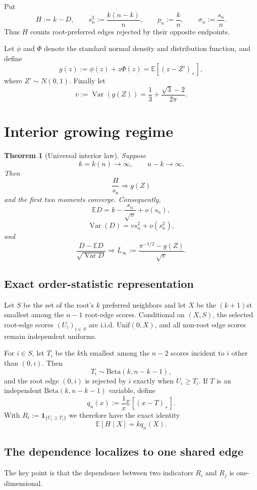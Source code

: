 \documentclass[11pt]{article}
\newtheorem{theorem}{Theorem}[section]
\theoremstyle{remark}
\newcommand{\E}{\mathbb E}
\newcommand{\Var}{\operatorname{Var}}
\newcommand{\1}{\mathbf 1}
\begin{document}
Put
\[
H:=k-D,
\qquad
s_n^2:=\frac{k(n-k)}n,
\qquad
p_n:=\frac kn,
\qquad
\sigma_n:=\frac{s_n}{n}.
\]
Thus $H$ counts root-preferred edges rejected by their opposite endpoints.

Let $\phi$ and $\Phi$ denote the standard normal density and distribution function, and define
\[
g(z):=\phi(z)+z\Phi(z)=\E[(z-Z')_+],
\]
where $Z'\sim N(0,1)$. Finally let
\[
v:=\Var(g(Z))=\frac13+\frac{\sqrt3-2}{2\pi}.
\]

\section{Interior growing regime}

\begin{theorem}[Universal interior law]\label{thm:interior}
Suppose
\[
k=k(n)\to\infty,
\qquad
n-k\to\infty.
\]
Then
\[
\frac{H}{s_n}\Longrightarrow g(Z)
\]
and the first two moments converge. Consequently,
\[
\E D=k-\frac{s_n}{\sqrt\pi}+o(s_n),
\]
\[
\Var(D)=v s_n^2+o(s_n^2),
\]
and
\[
\frac{D-\E D}{\sqrt{\Var D}}
\Longrightarrow
L_\infty:=\frac{\pi^{-1/2}-g(Z)}{\sqrt v}.
\]
\end{theorem}

\subsection{Exact order-statistic representation}

Let $S$ be the set of the root's $k$ preferred neighbors and let $X$ be the $(k+1)$st smallest among the $n-1$ root-edge scores. Conditional on $(X,S)$, the selected root-edge scores $(U_i)_{i\in S}$ are i.i.d. $\mathrm{Unif}(0,X)$, and all non-root edge scores remain independent uniforms.

For $i\in S$, let $T_i$ be the $k$th smallest among the $n-2$ scores incident to $i$ other than $(0,i)$. Then
\[
T_i\sim \mathrm{Beta}(k,n-k-1),
\]
and the root edge $(0,i)$ is rejected by $i$ exactly when $U_i\ge T_i$. If $T$ is an independent $\mathrm{Beta}(k,n-k-1)$ variable, define
\[
q_n(x):=\frac1x\E[(x-T)_+].
\]
With $R_i:=\1_{\{U_i\ge T_i\}}$ we therefore have the exact identity
\[
\E[H\mid X]=kq_n(X).
\tag{2.1}
\]

\subsection{The dependence localizes to one shared edge}

The key point is that the dependence between two indicators $R_i$ and $R_j$ is one-dimensional.
\end{document}
